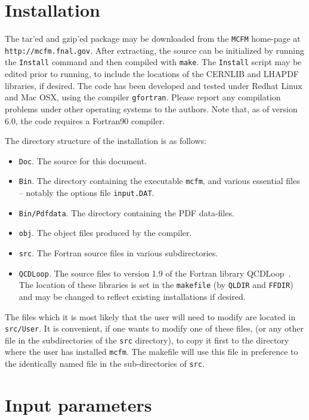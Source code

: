 \documentclass[12pt]{article}
\begin{document}
\section{Installation}

The tar'ed and gzip'ed package may be downloaded from
the {\tt MCFM} home-page at {\tt http://mcfm.fnal.gov}.
After extracting, the source can be initialized by running the
{\tt Install} command and then compiled with {\tt make}. The
{\tt Install} script may be edited prior to running, to include
the locations of the CERNLIB and LHAPDF libraries, if desired.
The code has been developed and tested under Redhat Linux and Mac OSX,
using the compiler {\tt gfortran}. Please report
any compilation problems under other operating systems to the authors.
Note that, as of version 6.0, the code requires a Fortran90 compiler.

The directory structure of the installation is as follows:
\begin{itemize}
\item {\tt Doc}. The source for this document.
\item {\tt Bin}. The directory containing the executable {\tt mcfm},
and various essential files -- notably the options file {\tt input.DAT}.
\item {\tt Bin/Pdfdata}. The directory containing the PDF data-files.
\item {\tt obj}. The object files produced by the compiler. 
\item {\tt src}. The Fortran source files in various subdirectories.
\item {\tt QCDLoop}. The source files to version 1.9 of the Fortran
library QCDLoop~\cite{Ellis:2007qk}. The location of these libraries
is set in the {\tt makefile} (by {\tt QLDIR} and {\tt FFDIR}) and may be
changed to reflect existing installations if desired. 
\end{itemize}
The files which it is most likely that the user will need to modify
are located in {\tt src/User}. It is convenient, if one wants to 
modify one of these files, (or any other file in the subdirectories of the 
{\tt src} directory),
to copy it first to the directory where the user has installed {\tt mcfm}.
The makefile will use this file in preference to the identically named
file in the sub-directories of {\tt src}.
 
\section{Input parameters}
\end{document}
